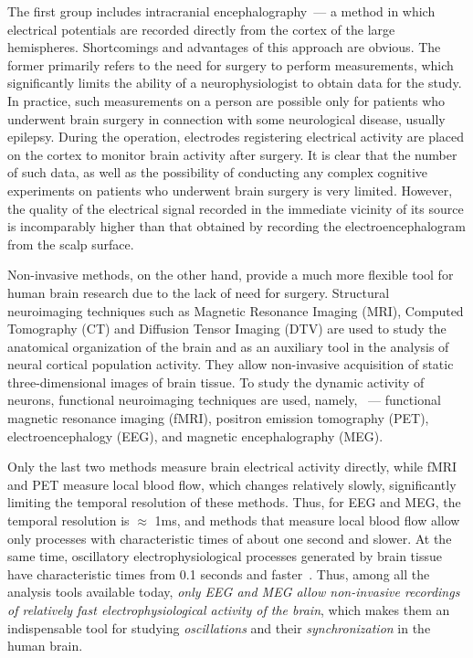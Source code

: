 The first group includes intracranial encephalography~--- a method in which
electrical potentials are recorded directly from the cortex of the large
hemispheres. Shortcomings and advantages of this approach are obvious. The
former primarily refers to the need for surgery to perform measurements, which
significantly limits the ability of a neurophysiologist to obtain data for the
study.  In practice, such measurements on a person are possible only for
patients who underwent brain surgery in connection with some neurological
disease, usually epilepsy.  During the operation, electrodes registering
electrical activity are placed on the cortex to monitor brain activity after
surgery. It is clear that the number of such data, as well as the possibility
of conducting any complex cognitive experiments on patients who underwent brain
surgery is very limited.  However, the quality of the electrical signal
recorded in the immediate vicinity of its source is incomparably higher than
that obtained by recording the electroencephalogram from the scalp surface.

Non-invasive methods, on the other hand, provide a much more flexible tool for
human brain research due to the lack of need for surgery.  Structural
neuroimaging techniques such as Magnetic Resonance Imaging (MRI), Computed
Tomography (CT) and Diffusion Tensor Imaging (DTV) are used to study the
anatomical organization of the brain and as an auxiliary tool in the analysis
of neural cortical population activity.  They allow non-invasive acquisition of
static three-dimensional images of brain tissue. To study the dynamic activity
of neurons, functional neuroimaging techniques are used, namely, ~---
functional magnetic resonance imaging (fMRI), positron emission tomography
(PET), electroencephalogy (EEG), and magnetic encephalography (MEG).

Only the last two methods measure brain electrical activity directly, while
fMRI and PET measure local blood flow, which changes relatively slowly,
significantly limiting the temporal resolution of these methods.  Thus, for EEG
and MEG, the temporal resolution is $\approx$ 1ms, and methods that measure
local blood flow allow only processes with characteristic times of about one
second and slower. At the same time, oscillatory electrophysiological processes
generated by brain tissue have characteristic times from 0.1 seconds and
faster~\cite{buzsaki}. Thus, among all the analysis tools available today,
\emph{ only EEG and MEG allow non-invasive recordings of relatively fast
electrophysiological activity of the brain}, which makes them an indispensable
tool for studying \emph{oscillations} and their \emph{synchronization} in the
human brain.

